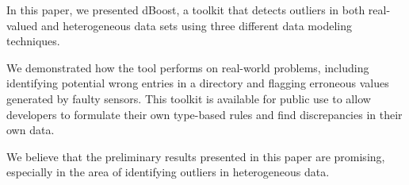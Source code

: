 
In this paper, we presented dBoost, a toolkit that detects outliers in both real-valued and heterogeneous data sets using three different data modeling techniques.

We demonstrated how the tool performs on real-world problems, including identifying potential wrong entries in a directory and flagging erroneous values generated by faulty sensors.
This toolkit is available for public use to allow developers to formulate their own type-based rules and find discrepancies in their own data.

We believe that the preliminary results presented in this paper are promising, especially in the area of identifying outliers in heterogeneous data.

